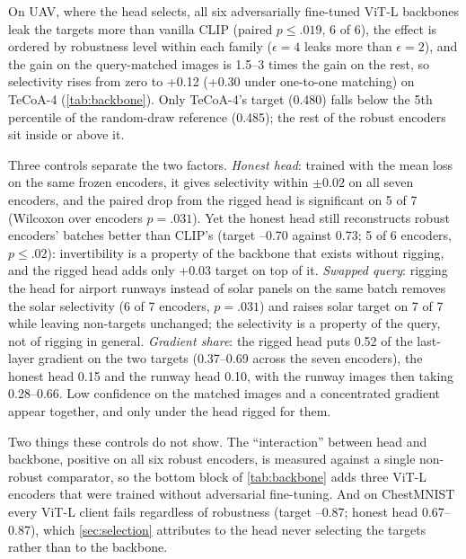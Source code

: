 On UAV, where the head selects, all six adversarially fine-tuned ViT-L backbones leak the targets more than vanilla CLIP (paired $p\le.019$, 6 of 6), the effect is ordered by robustness level within each family ($\epsilon=4$ leaks more than $\epsilon=2$), and the gain on the query-matched images is 1.5--3 times the gain on the rest, so selectivity rises from zero to +0.12 (+0.30 under one-to-one matching) on TeCoA-4 (\cref{tab:backbone}).
Only TeCoA-4's target \lpips (0.480) falls below the 5th percentile of the random-draw reference (0.485); the rest of the robust encoders sit inside or above it.

Three controls separate the two factors.
\emph{Honest head}: trained with the mean loss on the same frozen encoders, it gives selectivity within $\pm0.02$ on all seven encoders, and the paired drop from the rigged head is significant on 5 of 7 (Wilcoxon over encoders $p=.031$).
Yet the honest head still reconstructs robust encoders' batches better than CLIP's (target --0.70 against 0.73; 5 of 6 encoders, $p\le.02$): invertibility is a property of the backbone that exists without rigging, and the rigged head adds only +0.03 target \lpips on top of it.
\emph{Swapped query}: rigging the head for airport runways instead of solar panels on the same batch removes the solar selectivity (6 of 7 encoders, $p=.031$) and raises solar target \lpips on 7 of 7 while leaving non-targets unchanged; the selectivity is a property of the query, not of rigging in general.
\emph{Gradient share}: the rigged head puts 0.52 of the last-layer gradient on the two targets (0.37--0.69 across the seven encoders), the honest head 0.15 and the runway head 0.10, with the runway images then taking 0.28--0.66.
Low confidence on the matched images and a concentrated gradient appear together, and only under the head rigged for them.

Two things these controls do not show.
The ``interaction'' between head and backbone, positive on all six robust encoders, is measured against a single non-robust comparator, so the bottom block of \cref{tab:backbone} adds three ViT-L encoders that were trained without adversarial fine-tuning. 
And on ChestMNIST every ViT-L client fails regardless of robustness (target --0.87; honest head 0.67--0.87), which \cref{sec:selection} attributes to the head never selecting the targets rather than to the backbone.

